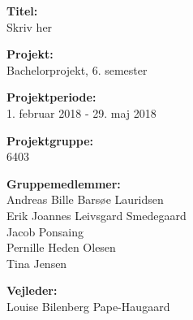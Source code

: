 \begin{minipage}[t]{0.48\textwidth}
\textbf{Titel:} %
\\\hspace*{2ex} 
Skriv her\\\hspace*{2ex} 

\textbf{Projekt:} %
\\\hspace*{2ex}
Bachelorprojekt, 6. semester \\\hspace*{2ex}

\textbf{Projektperiode:} %
\\\hspace*{2ex}
1. februar 2018 - 29. maj 2018 \\\hspace*{2ex}

\textbf{Projektgruppe:} %
\\\hspace*{2ex}
6403\\\hspace*{2ex}

\textbf{Gruppemedlemmer:} %
\\\hspace*{2ex}
Andreas Bille Barsøe Lauridsen \\\hspace*{2ex}
Erik Joannes Leivsgard Smedegaard\\\hspace*{2ex}
Jacob Ponsaing\\\hspace*{2ex}
Pernille Heden Olesen\\\hspace*{2ex}
Tina Jensen\\\hspace*{2ex}



\textbf{Vejleder:} %
\\\hspace*{2ex}
Louise Bilenberg Pape-Haugaard \\\hspace*{2ex}


\end{minipage}

